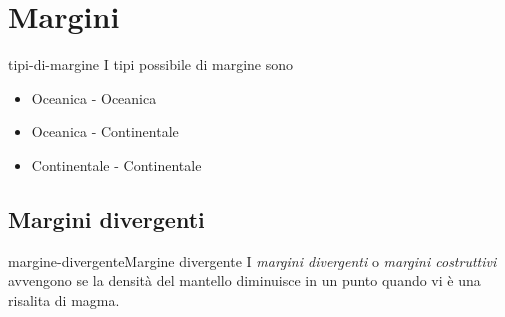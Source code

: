 \documentclass[preview]{standalone}
\begin{document}
\genpage

\section{Margini}

\begin{snippet}{tipi-di-margine}
    I tipi possibile di margine sono
    \begin{itemize}
        \item Oceanica - Oceanica
        \item Oceanica - Continentale
        \item Continentale - Continentale
    \end{itemize}
\end{snippet}

\subsection{Margini divergenti}

\begin{snippetdefinition}{margine-divergente}{Margine divergente}
    I \textit{margini divergenti} o \textit{margini costruttivi} avvengono se
    la densità del mantello diminuisce in un punto quando vi è una risalita di magma.
\end{snippetdefinition}
\end{document}
